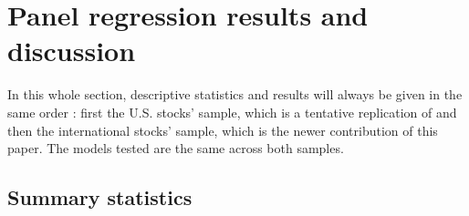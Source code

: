 \section{Panel regression results and discussion}
In this whole section, descriptive statistics and results will always be given in the same order : first the U.S. stocks' sample, which is a tentative replication of \cite{Ben-David2018} and then the international stocks' sample, which is the newer contribution of this paper. The models tested are the same across both samples.
\subsection{Summary statistics}
\subsubsection{}
